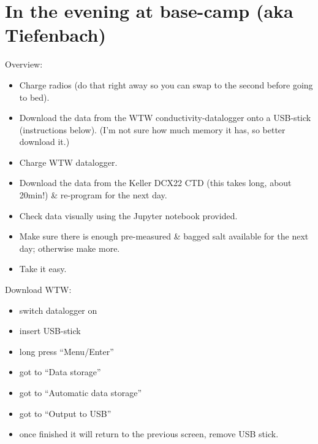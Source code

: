 \documentclass[DIV=15,halfparskip,11pt,headinclude]{scrartcl}
\begin{document}
\section{In the evening at base-camp (aka Tiefenbach)}
\label{sec-evening}
Overview:
\begin{itemize}
\item Charge radios (do that right away so you can swap to the second
  before going to bed).
\item Download the data from the WTW conductivity-datalogger onto a
  USB-stick (instructions below).  (I'm not sure how much memory it
  has, so better download it.)
\item Charge WTW datalogger.
\item Download the data from the Keller DCX22 CTD (this takes long,
    about 20min!) \& re-program for the next day.
\item Check data visually using the Jupyter notebook provided.
\item Make sure there is enough pre-measured \& bagged salt available
  for the next day; otherwise make more.
\item Take it easy.
\end{itemize}

Download WTW:
\begin{itemize}
\item switch datalogger on
\item insert USB-stick
\item long press ``Menu/Enter''
\item got to ``Data storage''
\item got to ``Automatic data storage''
\item got to ``Output to USB''
\item once finished it will return to the previous screen, remove USB
  stick.
\end{itemize}
\end{document}

